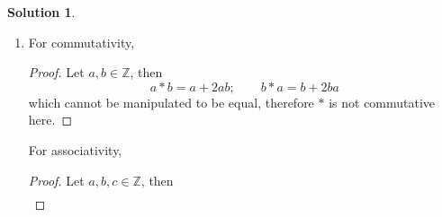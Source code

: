\documentclass[10pt]{article}
\theoremstyle{definition}
\newtheorem{soln}{Solution}
\newcommand{\justif}[2]{&{#1}&\text{#2}}
\begin{document}
\begin{soln}
\begin{enumerate}[label=(\alph*)]
\begin{proof}
            \begin{align*}
              a*b & = a+b-ab                                                             \\
                  & =b+a-ba \justif{\quad}{Commutativity of $+$ and $-$ on $\mathbb{Z}$} \\
                  & =b*a\justif{\quad}{Definition of $*$}\qedhere
            \end{align*}
          \end{proof}
          For associativity,
          \begin{proof}
            Let $a,b,c\in\mathbb{Z}$, then
            \begin{align*}
              a*(b*c) & = a*(b+c-bc)                                                                 \\
                      & = a + b+c-bc + a(b+c-bc)                                                     \\
                      & = a + b+c-bc + ab+ac-abc\justif{\quad}{$\cdot$ distributive on $\mathbb{Z}$} \\
            \end{align*}
            and
            \begin{align*}
              (a*b)*c & = (a+b-ab)*c                                                                  \\
                      & = a+b-ab + c + (a+b-ab)c                                                      \\
                      & = a+b-ab + c + ac+bc-abc \justif{\quad}{$\cdot$ distributive on $\mathbb{Z}$} \\
            \end{align*}
            because of the difference in sign on the $ab$ terms these two cannot be made to be equal, therefore $*$ is not associative. \qedhere
          \end{proof}
    \item For commutativity,
          \begin{proof}
            Let $a,b\in\mathbb{Z}$, then
            $$
              a*b = a+2ab;\qquad
              b*a = b+2ba
            $$
            which cannot be manipulated to be equal, therefore $*$ is not commutative here. \qedhere
          \end{proof}
          For associativity,
          \begin{proof}
            Let $a,b,c\in\mathbb{Z}$, then
            \begin{align*}

\end{align*}
\end{proof}
\end{enumerate}
\end{soln}
\end{document}
